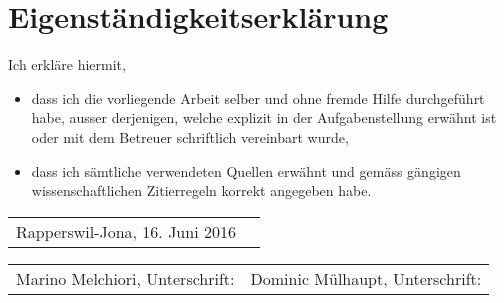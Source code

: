 \chapter*{Eigenständigkeitserklärung}

Ich erkläre hiermit,
\begin{itemize}
\item dass ich die vorliegende Arbeit selber und ohne fremde Hilfe durchgeführt habe, ausser derjenigen, welche explizit in der Aufgabenstellung erwähnt ist oder mit dem Betreuer schriftlich vereinbart wurde,
\item dass ich sämtliche verwendeten Quellen erwähnt und gemäss gängigen wissenschaftlichen Zitierregeln korrekt angegeben habe.
\end{itemize}

\vspace{3cm}

\begin{tabular}{p{0.5\twocelltabwidth}p{0.5\twocelltabwidth}}
Rapperswil-Jona, 16. Juni 2016 & \\ 
\end{tabular} 

\vspace{0.5cm}

\begin{tabular}{p{0.5\twocelltabwidth}p{0.5\twocelltabwidth}}
Marino Melchiori, Unterschrift: & Dominic Mülhaupt, Unterschrift: \\ 
\end{tabular} \\ 
